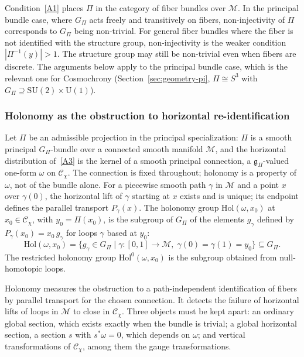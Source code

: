     Condition~\ref{A1} places $\Pi$ in the category of fiber bundles over $\mathcal{M}$.
    In the principal bundle case, where $G_\Pi$ acts freely and transitively on fibers,
    non-injectivity of $\Pi$ corresponds to $G_\Pi$ being non-trivial.
    For general fiber bundles where the fiber is not identified with the structure group,
    non-injectivity is the weaker condition $|\Pi^{-1}(y)| > 1$.
    The structure group may still be non-trivial even when fibers are discrete.
    The arguments below apply to the principal bundle case, which is the relevant one
    for Cosmochrony (Section~\ref{sec:geometry-pi}, $\Pi \cong S^3$ with $G_\Pi \supseteq \mathrm{SU}(2) \times \mathrm{U}(1)$).

  \subsubsection*{Holonomy as the obstruction to horizontal re-identification}
    \label{subsec:stepA-holonomy}

    Let $\Pi$ be an admissible projection in the principal specialization: $\Pi$ is a smooth principal
    $G_\Pi$-bundle over a connected smooth manifold $\mathcal{M}$, and the horizontal distribution of~\ref{A3} is
    the kernel of a smooth principal connection, a $\mathfrak{g}_\Pi$-valued one-form $\omega$ on $\mathcal{C}_\chi$.
    The connection is fixed throughout; holonomy is a property of $\omega$, not of the bundle alone.
    For a piecewise smooth path $\gamma$ in $\mathcal{M}$ and a point $x$ over $\gamma(0)$, the horizontal lift of
    $\gamma$ starting at $x$ exists and is unique; its endpoint defines the parallel transport $P_\gamma(x)$.
    The holonomy group $\mathrm{Hol}(\omega, x_0)$ at $x_0 \in \mathcal{C}_\chi$, with $y_0 = \Pi(x_0)$, is the
    subgroup of $G_\Pi$ of the elements $g_\gamma$ defined by $P_\gamma(x_0) = x_0\, g_\gamma$ for loops $\gamma$
    based at $y_0$:
    \begin{equation}
      \mathrm{Hol}(\omega, x_0)
      =
      \bigl\{ g_\gamma \in G_\Pi \;\big|\;
      \gamma : [0,1] \to \mathcal{M},
      \;
      \gamma(0) = \gamma(1) = y_0
      \bigr\}
      \subseteq G_\Pi.
    \end{equation}
    The restricted holonomy group $\mathrm{Hol}^0(\omega, x_0)$ is the subgroup obtained from null-homotopic loops.

    Holonomy measures the obstruction to a path-independent identification of fibers by parallel transport for the
    chosen connection.
    It detects the failure of horizontal lifts of loops in $\mathcal{M}$ to close in $\mathcal{C}_\chi$.
    Three objects must be kept apart:
    an ordinary global section, which exists exactly when the bundle is trivial;
    a global horizontal section, a section $s$ with $s^*\omega = 0$, which depends on $\omega$;
    and vertical transformations of $\mathcal{C}_\chi$, among them the gauge transformations.

